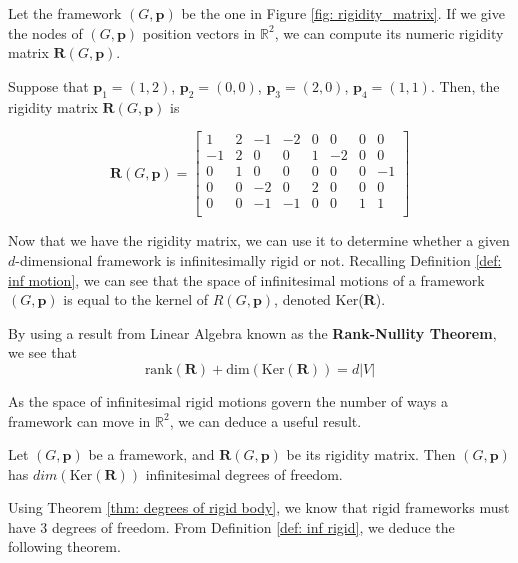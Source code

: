 \begin{example}
\label{eg: rigidity matrix}
Let the framework $(G,\mathbf{p})$ be the one in Figure \ref{fig: rigidity_matrix}. If we give the nodes of $(G,\mathbf{p})$ position vectors in $\mathbb{R}^2$, we can compute its numeric rigidity matrix $\mathbf{R}(G,\mathbf{p})$. 

\noindent
Suppose that $\mathbf{p}_1 = (1,2)$, $\mathbf{p}_2 = (0,0)$, $\mathbf{p}_3 = (2,0)$, $\mathbf{p}_4 = (1,1)$. Then, the rigidity matrix $\mathbf{R}(G,\mathbf{p})$ is

\[
\mathbf{R}(G,\mathbf{p}) = 
\begin{bmatrix}
1 & 2 & -1 & -2 & 0 & 0 & 0 & 0 \\
-1 & 2 & 0 & 0 & 1 & -2 & 0 & 0 \\
0 & 1 & 0 & 0 & 0 & 0 & 0 & -1 \\
0 & 0 & -2 & 0 & 2 & 0 & 0 & 0 \\
0 & 0 & -1 & -1 & 0 & 0 & 1 & 1 \\
\end{bmatrix}
\]
\end{example}

\begin{flushleft}
Now that we have the rigidity matrix, we can use it to determine whether a given $d$-dimensional framework is infinitesimally rigid or not. Recalling Definition \ref{def: inf motion}, we can see that the space of infinitesimal motions of a framework $(G,\mathbf{p})$ is equal to the kernel of $R(G,\mathbf{p})$, denoted Ker($\mathbf{R}$).

By using a result from Linear Algebra known as the \textbf{Rank-Nullity Theorem}, we see that
\vspace{-1 mm}
\[
\text{rank}(\mathbf{R}) + \text{dim}(\text{Ker}(\mathbf{R})) = d|V|
\]
\end{flushleft}

\begin{flushleft}
As the space of infinitesimal rigid motions govern the number of ways a framework can move in $\mathbb{R}^2$, we can deduce a useful result.
\end{flushleft}

\begin{lemma}
\cite{counting_frameworks} Let $(G,\mathbf{p})$ be a framework, and $\mathbf{R}(G,\mathbf{p})$ be its rigidity matrix. Then $(G,\mathbf{p})$ has $dim(\text{Ker}(\mathbf{R}))$ infinitesimal degrees of freedom. 
\end{lemma}

\begin{flushleft}
Using Theorem \ref{thm: degrees of rigid body}, we know that rigid frameworks must have $3$ degrees of freedom. From Definition \ref{def: inf rigid}, we deduce the following theorem.
\end{flushleft}

